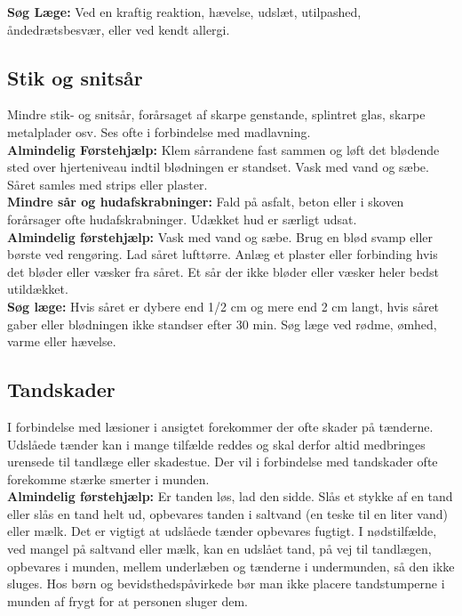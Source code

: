 \documentclass[../../../main.tex]{subfiles}
\begin{document}
\begin{multicols}{2}
\textbf{Søg Læge:} Ved en kraftig reaktion, hævelse, udslæt, utilpashed, åndedrætsbesvær, eller ved kendt allergi. 
\\

\subsection*{Stik og snitsår} Mindre stik- og snitsår, forårsaget af skarpe genstande, splintret glas, skarpe metalplader osv. Ses ofte i forbindelse med madlavning.
\\

\textbf{Almindelig Førstehjælp:} Klem sårrandene fast sammen og løft det blødende sted over hjerteniveau indtil blødningen er standset. Vask med vand og sæbe. Såret samles med strips eller plaster.
\\

\textbf{Mindre sår og hudafskrabninger:} Fald på asfalt, beton eller i skoven forårsager ofte hudafskrabninger. Udækket hud er særligt udsat.
\\

\textbf{Almindelig førstehjælp:} Vask med vand og sæbe. Brug en blød svamp eller børste ved rengøring. Lad såret lufttørre. Anlæg et plaster eller forbinding hvis det bløder eller væsker fra såret. Et sår der ikke bløder eller væsker heler bedst utildækket.
\\

\textbf{Søg læge:} Hvis såret er dybere end 1/2 cm og mere end 2 cm langt, hvis såret gaber eller blødningen ikke standser efter 30 min. Søg læge ved rødme, ømhed, varme eller hævelse. 
\\

\subsection*{Tandskader} I forbindelse med læsioner i ansigtet forekommer der
ofte skader på tænderne. Udslåede tænder kan i mange tilfælde reddes og skal derfor altid medbringes urensede til tandlæge eller skadestue. Der vil i forbindelse med tandskader ofte forekomme stærke smerter i munden.
\\

\textbf{Almindelig førstehjælp:} Er tanden løs, lad den sidde. Slås et stykke af en tand eller slås en tand helt ud, opbevares tanden i saltvand (en teske til en liter vand) eller mælk. Det er vigtigt at udslåede tænder opbevares fugtigt. I nødstilfælde, ved mangel på saltvand eller mælk, kan en udslået tand, på vej til tandlægen, opbevares i munden, mellem underlæben og tænderne i undermunden, så den ikke sluges. Hos børn og bevidsthedspåvirkede bør man ikke placere tandstumperne i munden af frygt for at personen sluger dem.
\\


\end{multicols}
\end{document}

